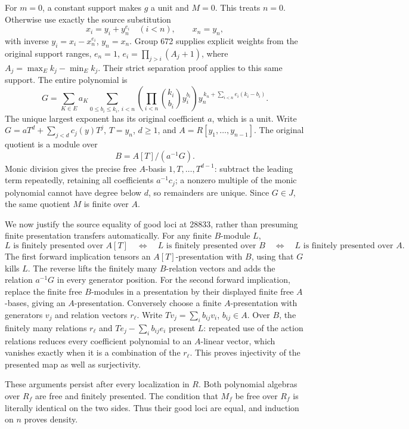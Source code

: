 For \(m=0\), a constant support makes \(g\) a unit and \(M=0\). This treats \(n=0\). Otherwise use exactly the source substitution \[
 x_i=y_i+y_n^{e_i}\quad(i<n),\qquad x_n=y_n,
\] with inverse \(y_i=x_i-x_n^{e_i}\), \(y_n=x_n\). Group 672 supplies explicit weights from the original support ranges, \(e_n=1\), \(e_i=\prod_{j>i}(A_j+1)\), where \(A_j=\max_E k_j-\min_E k_j\). Their strict separation proof applies to this same support. The entire polynomial is \[
 G=\sum_{K\in E}a_K
 \sum_{0\le b_i\le k_i,\ i<n}
 \left(\prod_{i<n}\binom{k_i}{b_i}y_i^{b_i}\right)
 y_n^{\,k_n+\sum_{i<n}e_i(k_i-b_i)}.
\] The unique largest exponent has its original coefficient \(a\), which is a unit. Write \(G=aT^d+\sum_{j<d}c_j(y)T^j\), \(T=y_n\), \(d\ge1\), and \(A=R[y_1,\ldots,y_{n-1}]\). The original quotient is a module over \[
 B=A[T]/(a^{-1}G).
\] Monic division gives the precise free \(A\)-basis \(1,T,\ldots,T^{d-1}\): subtract the leading term repeatedly, retaining all coefficients \(a^{-1}c_j\); a nonzero multiple of the monic polynomial cannot have degree below \(d\), so remainders are unique. Since \(G\in J\), the same quotient \(M\) is finite over \(A\).

We now justify the source equality of good loci at 28833, rather than presuming finite presentation transfers automatically. For any finite \(B\)-module \(L\), \[
 L\text{ is finitely presented over }A[T]
 \quad\Longleftrightarrow\quad
 L\text{ is finitely presented over }B
 \quad\Longleftrightarrow\quad
 L\text{ is finitely presented over }A.
\] The first forward implication tensors an \(A[T]\)-presentation with \(B\), using that \(G\) kills \(L\). The reverse lifts the finitely many \(B\)-relation vectors and adds the relation \(a^{-1}G\) in every generator position. For the second forward implication, replace the finite free \(B\)-modules in a presentation by their displayed finite free \(A\)-bases, giving an \(A\)-presentation. Conversely choose a finite \(A\)-presentation with generators \(v_j\) and relation vectors \(r_\ell\). Write \(Tv_j=\sum_i b_{ij}v_i\), \(b_{ij}\in A\). Over \(B\), the finitely many relations \(r_\ell\) and \(T e_j-\sum_i b_{ij}e_i\) present \(L\): repeated use of the action relations reduces every coefficient polynomial to an \(A\)-linear vector, which vanishes exactly when it is a combination of the \(r_\ell\). This proves injectivity of the presented map as well as surjectivity.

These arguments persist after every localization in \(R\). Both polynomial algebras over \(R_f\) are free and finitely presented. The condition that \(M_f\) be free over \(R_f\) is literally identical on the two sides. Thus their good loci are equal, and induction on \(n\) proves density.

